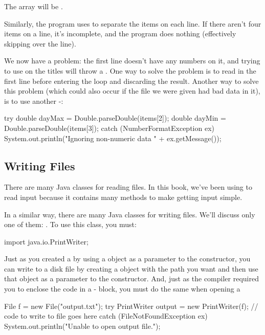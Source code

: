 The  array will be .

Similarly, the program uses  to separate the items on each line. If there aren't four items on a line, it's incomplete, and the program does nothing (effectively skipping over the line).

We now have a problem: the first line doesn't have any numbers on it, and trying to use  on the titles will throw a . One way to solve the problem is to read in the first line before entering the  loop and discarding the result. Another way to solve this problem (which could also occur if the file we were given had bad data in it), is to use another -:

\begin{code}
try {
    double dayMax = Double.parseDouble(items[2]);
    double dayMin = Double.parseDouble(items[3]);
}
catch (NumberFormatException ex) {
    System.out.println("Ignoring non-numeric data "
        + ex.getMessage());
}
\end{code}


\subsection{Writing Files}

There are many Java classes for reading files. In this book, we've been using  to read input because it contains many methods to make getting input simple.

In a similar way, there are many Java classes for writing files. We'll discuss only one of them: . To use this class, you must:

\begin{code}
import java.io.PrintWriter;
\end{code}

Just as you created a  by using a  object as a parameter to the constructor, you can write to a disk file by creating a  object with the path you want and then use that object as a parameter to the  constructor. And, just as the compiler required you to enclose the code in a - block, you must do the same when opening a 

\begin{code}
File f = new File("output.txt");
try {
    PrintWriter output = new PrintWriter(f);
    // code to write to file goes here
}
catch (FileNotFoundException ex) {
    System.out.println("Unable to open output file.");
}
\end{code}

